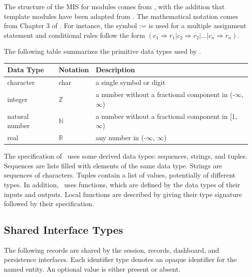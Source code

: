 \documentclass[12pt, titlepage]{article}
\begin{document}

The structure of the MIS for modules comes from \citet{HoffmanAndStrooper1995},
with the addition that template modules have been adapted from
\cite{GhezziEtAl2003}.  The mathematical notation comes from Chapter 3 of
\citet{HoffmanAndStrooper1995}.  For instance, the symbol := is used for a
multiple assignment statement and conditional rules follow the form $(c_1
\Rightarrow r_1 | c_2 \Rightarrow r_2 | ... | c_n \Rightarrow r_n )$.

The following table summarizes the primitive data types used by \progname. 

\begin{center}
\renewcommand{\arraystretch}{1.2}
\noindent 
\begin{tabular}{l l p{7.5cm}} 
\toprule 
\textbf{Data Type} & \textbf{Notation} & \textbf{Description}\\ 
\midrule
character & char & a single symbol or digit\\
integer & $\mathbb{Z}$ & a number without a fractional component in (-$\infty$, $\infty$) \\
natural number & $\mathbb{N}$ & a number without a fractional component in [1, $\infty$) \\
real & $\mathbb{R}$ & any number in (-$\infty$, $\infty$)\\
\bottomrule
\end{tabular} 
\end{center}

\noindent
The specification of \progname \ uses some derived data types: sequences, strings, and
tuples. Sequences are lists filled with elements of the same data type. Strings
are sequences of characters. Tuples contain a list of values, potentially of
different types. In addition, \progname \ uses functions, which
are defined by the data types of their inputs and outputs. Local functions are
described by giving their type signature followed by their specification.

\subsection{Shared Interface Types} \label{sec:interface-types}

The following records are shared by the session, records, dashboard, and
persistence interfaces. Each identifier type denotes an opaque identifier
for the named entity. An optional value is either present or absent.
\end{document}
